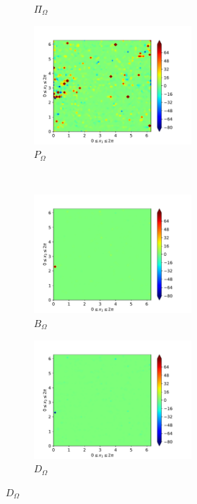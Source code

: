 \begin{figure}[H]
\begin{subfigure}{0.45\textwidth}
        \caption{$\Pi_{\Omega}$}
    \end{subfigure}
    \newline
    \begin{subfigure}{0.45\textwidth}
        \includegraphics[height=1.75in]{media/run-cds-65/P-enst-1480}
        \caption{$P_{\Omega}$}
    \end{subfigure}
    ~
    \begin{subfigure}{0.45\textwidth}
        \includegraphics[height=1.75in]{media/run-cds-65/B-enst-1480}
        \caption{$B_{\Omega}$}
    \end{subfigure}
    \newline
    \begin{subfigure}{0.45\textwidth}
        \includegraphics[height=1.75in]{media/run-cds-65/D-enst-1480}
        \caption{$D_{\Omega}$}
    \end{subfigure}
\end{figure}

\newpage

